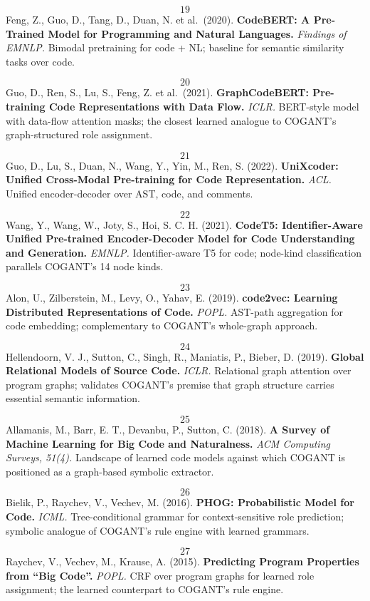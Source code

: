 \documentclass[
]{article}
\begin{document}
\[19\] Feng, Z., Guo, D., Tang, D., Duan, N. et al.~(2020).
\textbf{CodeBERT: A Pre-Trained Model for Programming and Natural
Languages.} \emph{Findings of EMNLP.} Bimodal pretraining for code + NL;
baseline for semantic similarity tasks over code.

\[20\] Guo, D., Ren, S., Lu, S., Feng, Z. et al.~(2021).
\textbf{GraphCodeBERT: Pre-training Code Representations with Data
Flow.} \emph{ICLR.} BERT-style model with data-flow attention masks; the
closest learned analogue to COGANT's graph-structured role assignment.

\[21\] Guo, D., Lu, S., Duan, N., Wang, Y., Yin, M., Ren, S. (2022).
\textbf{UniXcoder: Unified Cross-Modal Pre-training for Code
Representation.} \emph{ACL.} Unified encoder-decoder over AST, code, and
comments.

\[22\] Wang, Y., Wang, W., Joty, S., Hoi, S. C. H. (2021).
\textbf{CodeT5: Identifier-Aware Unified Pre-trained Encoder-Decoder
Model for Code Understanding and Generation.} \emph{EMNLP.}
Identifier-aware T5 for code; node-kind classification parallels
COGANT's 14 node kinds.

\[23\] Alon, U., Zilberstein, M., Levy, O., Yahav, E. (2019).
\textbf{code2vec: Learning Distributed Representations of Code.}
\emph{POPL.} AST-path aggregation for code embedding; complementary to
COGANT's whole-graph approach.

\[24\] Hellendoorn, V. J., Sutton, C., Singh, R., Maniatis, P.,
Bieber, D. (2019). \textbf{Global Relational Models of Source Code.}
\emph{ICLR.} Relational graph attention over program graphs; validates
COGANT's premise that graph structure carries essential semantic
information.

\[25\] Allamanis, M., Barr, E. T., Devanbu, P., Sutton, C. (2018).
\textbf{A Survey of Machine Learning for Big Code and Naturalness.}
\emph{ACM Computing Surveys, 51(4).} Landscape of learned code models
against which COGANT is positioned as a graph-based symbolic extractor.

\[26\] Bielik, P., Raychev, V., Vechev, M. (2016). \textbf{PHOG:
Probabilistic Model for Code.} \emph{ICML.} Tree-conditional grammar for
context-sensitive role prediction; symbolic analogue of COGANT's rule
engine with learned grammars.

\[27\] Raychev, V., Vechev, M., Krause, A. (2015). \textbf{Predicting
Program Properties from ``Big Code''.} \emph{POPL.} CRF over program
graphs for learned role assignment; the learned counterpart to COGANT's
rule engine.
\end{document}
